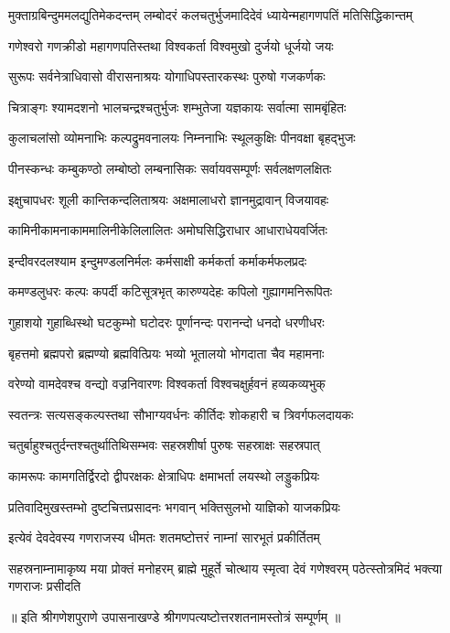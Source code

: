 
{मुक्ताग्रबिन्दुममलद्युतिमेकदन्तम्}
{लम्बोदरं कलचतुर्भुजमादिदेवं}
{ध्यायेन्महागणपतिं मतिसिद्धिकान्तम्}

\twolineshloka
{गणेश्वरो गणक्रीडो महागणपतिस्तथा}
{विश्वकर्ता विश्वमुखो दुर्जयो धूर्जयो जयः}

\twolineshloka
{सुरूपः सर्वनेत्राधिवासो वीरासनाश्रयः}
{योगाधिपस्तारकस्थः पुरुषो गजकर्णकः}

\twolineshloka
{चित्राङ्गः श्यामदशनो भालचन्द्रश्चतुर्भुजः}
{शम्भुतेजा यज्ञकायः सर्वात्मा सामबृंहितः}

\twolineshloka
{कुलाचलांसो व्योमनाभिः कल्पद्रुमवनालयः}
{निम्ननाभिः स्थूलकुक्षिः पीनवक्षा बृहद्भुजः}

\twolineshloka
{पीनस्कन्धः कम्बुकण्ठो लम्बोष्ठो लम्बनासिकः}
{सर्वायवसम्पूर्णः सर्वलक्षणलक्षितः}

\twolineshloka
{इक्षुचापधरः शूली कान्तिकन्दलिताश्रयः}
{अक्षमालाधरो ज्ञानमुद्रावान् विजयावहः}

\twolineshloka
{कामिनीकामनाकाममालिनीकेलिलालितः}
{अमोघसिद्धिराधार आधाराधेयवर्जितः}

\twolineshloka
{इन्दीवरदलश्याम इन्दुमण्डलनिर्मलः}
{कर्मसाक्षी कर्मकर्ता कर्माकर्मफलप्रदः}

\twolineshloka
{कमण्डलुधरः कल्पः कपर्दी कटिसूत्रभृत्}
{कारुण्यदेहः कपिलो गुह्यागमनिरूपितः}

\twolineshloka
{गुहाशयो गुहाब्धिस्थो घटकुम्भो घटोदरः}
{पूर्णानन्दः परानन्दो धनदो धरणीधरः}

\twolineshloka
{बृहत्तमो ब्रह्मपरो ब्रह्मण्यो ब्रह्मवित्प्रियः}
{भव्यो भूतालयो भोगदाता चैव महामनाः}

\twolineshloka
{वरेण्यो वामदेवश्च वन्द्यो वज्रनिवारणः}
{विश्वकर्ता विश्वचक्षुर्हवनं हव्यकव्यभुक्}

\twolineshloka
{स्वतन्त्रः सत्यसङ्कल्पस्तथा सौभाग्यवर्धनः}
{कीर्तिदः शोकहारी च त्रिवर्गफलदायकः}

\twolineshloka
{चतुर्बाहुश्चतुर्दन्तश्चतुर्थातिथिसम्भवः}
{सहस्रशीर्षा पुरुषः सहस्राक्षः सहस्रपात्}

\twolineshloka
{कामरूपः कामगतिर्द्विरदो द्वीपरक्षकः}
{क्षेत्राधिपः क्षमाभर्ता लयस्थो लड्डुकप्रियः}

\twolineshloka
{प्रतिवादिमुखस्तम्भो दुष्टचित्तप्रसादनः}
{भगवान् भक्तिसुलभो याज्ञिको याजकप्रियः}

\twolineshloka
{इत्येवं देवदेवस्य गणराजस्य धीमतः}
{शतमष्टोत्तरं नाम्नां सारभूतं प्रकीर्तितम्}

\threelineshloka
{सहस्रनाम्नामाकृष्य मया प्रोक्तं मनोहरम्}
{ब्राह्मे मुहूर्ते चोत्थाय स्मृत्वा देवं गणेश्वरम्}
{पठेत्स्तोत्रमिदं भक्त्या गणराजः प्रसीदति}

{॥ इति श्रीगणेशपुराणे उपासनाखण्डे श्रीगणपत्यष्टोत्तरशतनामस्तोत्रं सम्पूर्णम् ॥}
